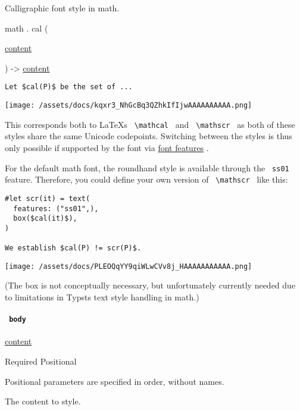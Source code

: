 Calligraphic font style in math.

math { . } { cal } (

{ \href{/docs/reference/foundations/content/}{content} }

) -\textgreater{} \href{/docs/reference/foundations/content/}{content}

\begin{verbatim}
Let $cal(P)$ be the set of ...
\end{verbatim}

\texttt{[image: /assets/docs/kqxr3\_NhGcBq3QZhkIfIjwAAAAAAAAAA.png]}

This corresponds both to LaTeX\textquotesingle s
\texttt{\ \textbackslash{}mathcal\ } and
\texttt{\ \textbackslash{}mathscr\ } as both of these styles share the
same Unicode codepoints. Switching between the styles is thus only
possible if supported by the font via
\href{/docs/reference/text/text/\#parameters-features}{font features} .

For the default math font, the roundhand style is available through the
\texttt{\ ss01\ } feature. Therefore, you could define your own version
of \texttt{\ \textbackslash{}mathscr\ } like this:

\begin{verbatim}
#let scr(it) = text(
  features: ("ss01",),
  box($cal(it)$),
)

We establish $cal(P) != scr(P)$.
\end{verbatim}

\texttt{[image: /assets/docs/PLEOQqYY9qiWLwCVv8j\_HAAAAAAAAAAA.png]}

(The box is not conceptually necessary, but unfortunately currently
needed due to limitations in Typst\textquotesingle s text style handling
in math.)

\paragraph{\texorpdfstring{\texttt{\ body\ }}{ body }}\label{functions-cal-body}

\href{/docs/reference/foundations/content/}{content}

{Required} {{ Positional }}

\label{functions-cal-body-positional-tooltip}
Positional parameters are specified in order, without names.

The content to style.

